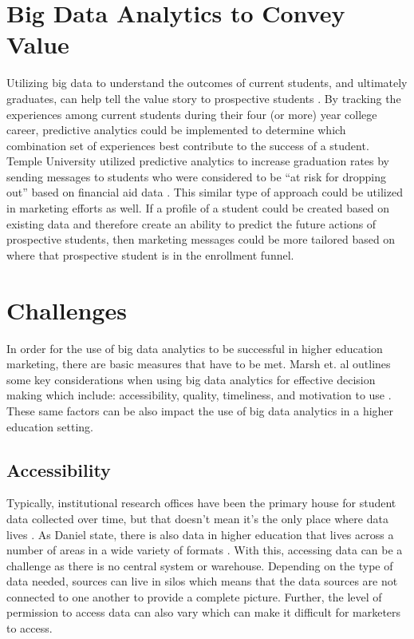 \documentclass[sigconf]{acmart}
\begin{document}
\section{Big Data Analytics to Convey Value}
Utilizing big data to understand the outcomes of current students, and ultimately graduates, can help tell the value story to prospective students \cite{Research2014}. By tracking the experiences among current students during their four (or more) year college career, predictive analytics could be implemented to determine which combination set of experiences best contribute to the success of a student. Temple University utilized predictive analytics to increase graduation rates by sending messages to students who were considered to be ``at risk for dropping out'' based on financial aid data \cite{Zinshteyn2016}. This similar type of approach could be utilized in marketing efforts as well. If a profile of a student could be created based on existing data and therefore create an ability to predict the future actions of prospective students, then marketing messages could be more tailored based on where that prospective student is in the enrollment funnel. 

\section{Challenges}
In order for the use of big data analytics to be successful in higher education marketing, there are basic measures that have to be met. Marsh et. al outlines some key considerations when using big data analytics for effective decision making which include: accessibility, quality, timeliness, and motivation to use \cite{Marsh2006}. These same factors can be also impact the use of big data analytics in a higher education setting. 

\subsection{Accessibility}
Typically, institutional research offices have been the primary house for student data collected over time, but that doesn't mean it's the only place where data lives \cite{Picciano2012}. As Daniel state, there is also data in higher education that lives across a number of areas in a wide variety of formats \cite{Daniel2015}. With this, accessing data can be a challenge as there is no central system or warehouse. Depending on the type of data needed, sources can live in silos which means that the data sources are not connected to one another to provide a complete picture. Further, the level of permission to access data can also vary which can make it difficult for marketers to access. 
\end{document}
